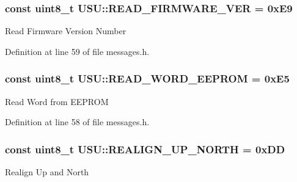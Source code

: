 \hypertarget{namespace_u_s_u_a7d0e77d37d6107d2869c30f57412e8b0}{
\subsubsection[{\-R\-E\-A\-D\-\_\-\-F\-I\-R\-M\-W\-A\-R\-E\-\_\-\-V\-E\-R}]{\setlength{\rightskip}{0pt plus 5cm}const uint8\-\_\-t {\bf \-U\-S\-U\-::\-R\-E\-A\-D\-\_\-\-F\-I\-R\-M\-W\-A\-R\-E\-\_\-\-V\-E\-R} = 0x\-E9}}\label{namespace_u_s_u_a7d0e77d37d6107d2869c30f57412e8b0}
\-Read \-Firmware \-Version \-Number 

\-Definition at line 59 of file messages.\-h.

\hypertarget{namespace_u_s_u_ac9d01a02c622d06449580697749db1f5}{
\subsubsection[{\-R\-E\-A\-D\-\_\-\-W\-O\-R\-D\-\_\-\-E\-E\-P\-R\-O\-M}]{\setlength{\rightskip}{0pt plus 5cm}const uint8\-\_\-t {\bf \-U\-S\-U\-::\-R\-E\-A\-D\-\_\-\-W\-O\-R\-D\-\_\-\-E\-E\-P\-R\-O\-M} = 0x\-E5}}\label{namespace_u_s_u_ac9d01a02c622d06449580697749db1f5}
\-Read \-Word from \-E\-E\-P\-R\-O\-M 

\-Definition at line 58 of file messages.\-h.

\hypertarget{namespace_u_s_u_a9c5f8777b9c35aaaa0b64490d1f9a20d}{
\subsubsection[{\-R\-E\-A\-L\-I\-G\-N\-\_\-\-U\-P\-\_\-\-N\-O\-R\-T\-H}]{\setlength{\rightskip}{0pt plus 5cm}const uint8\-\_\-t {\bf \-U\-S\-U\-::\-R\-E\-A\-L\-I\-G\-N\-\_\-\-U\-P\-\_\-\-N\-O\-R\-T\-H} = 0x\-D\-D}}\label{namespace_u_s_u_a9c5f8777b9c35aaaa0b64490d1f9a20d}
\-Realign \-Up and \-North 

